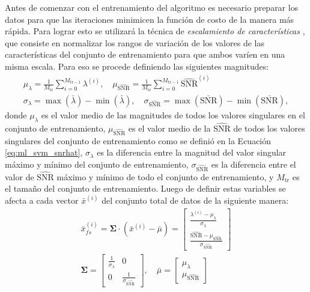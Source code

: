 Antes de comenzar con el entrenamiento del algoritmo es necesario preparar los datos para que las iteraciones minimicen la función de costo de la manera más rápida. Para lograr esto se utilizará la técnica de \emph{escalamiento de características} \cite{bib:machinelearning}, que consiste en normalizar los rangos de variación de los valores de las características del conjunto de entrenamiento para que ambos varíen en una misma escala. Para eso se procede definiendo las siguientes magnitudes:
\begin{equation}
  \begin{gathered}
    \mu_{\lambda}=\frac{1}{M_{\textrm{tr}}} \sum_{i=0}^{M_{\textrm{tr}-1}} \lambda^{(i)},\quad \mu_{\hat{\mathrm{SNR}}}=\frac{1}{M_{\textrm{tr}}} \sum_{i=0}^{M_{\textrm{tr}-1}} \hat{\mathrm{SNR}}^{(i)}\\
    \sigma_{\lambda}=\max(\bar{\lambda})-\min(\bar{\lambda}),\quad \sigma_{\hat{\mathrm{SNR}}}=\max(\bar{\mathrm{SNR}})-\min(\bar{\mathrm{SNR}}),
  \end{gathered}
\end{equation}
donde $\mu_{\lambda}$ es el valor medio de las magnitudes de todos los valores singulares en el conjunto de entrenamiento, $\mu_{\hat{\mathrm{SNR}}}$ es el valor medio de la $\hat{\mathrm{SNR}}$ de todos los valores singulares del conjunto de entrenamiento como se definió en la Ecuación \ref{eq:ml_svm_snrhat}, $\sigma_{\lambda}$ es la diferencia entre la magnitud del valor singular máximo y mínimo del conjunto de entrenamiento, $\sigma_{\hat{\mathrm{SNR}}}$ es la diferencia entre el valor de $\hat{\mathrm{SNR}}$ máximo y mínimo de todo el conjunto de entrenamiento, y $M_{\textrm{tr}}$ es el tamaño del conjunto de entrenamiento. Luego de definir estas variables se afecta a cada vector $\bar{x}^{(i)}$ del conjunto total de datos de la siguiente manera:
\begin{gather}
  \bar{x}_{fs}^{(i)}=\mathbf{\Sigma} \cdot \left( \bar{x}^{(i)} - \bar{\mu}  \right)=\begin{bmatrix}
    \frac{\lambda^{(i)}-\mu_{\lambda}}{\sigma_{\lambda}} \\
    \frac{\hat{\mathrm{SNR}}-\mu_{\hat{\mathrm{SNR}}}}{\sigma_{\hat{\mathrm{SNR}}}}
  \end{bmatrix}\\
  \mathbf{\Sigma}=\begin{bmatrix}
    \frac{1}{\sigma_{\lambda}} & 0                                     \\
    0                          & \frac{1}{\sigma_{\hat{\mathrm{SNR}}}}
  \end{bmatrix},\quad \bar{\mu}=\begin{bmatrix}
    \mu_{\lambda} \\
    \mu_{\hat{\mathrm{SNR}}}
  \end{bmatrix}\nonumber
\end{gather}


